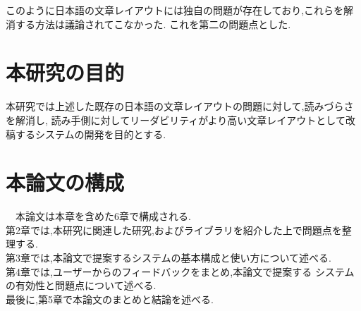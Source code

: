 このように日本語の文章レイアウトには独自の問題が存在しており,これらを解消する方法は議論されてこなかった.
これを第二の問題点とした.

\section{本研究の目的}
本研究では上述した既存の日本語の文章レイアウトの問題に対して,読みづらさを解消し,
読み手側に対してリーダビリティがより高い文章レイアウトとして改稿するシステムの開発を目的とする.

\section{本論文の構成}
 本論⽂は本章を含めた6章で構成される.
 \\第2章では,本研究に関連した研究,およびライブラリを紹介した上で問題点を整理する.
 \\第3章では,本論⽂で提案するシステムの基本構成と使い⽅について述べる.
 \\第4章では,ユーザーからのフィードバックをまとめ,本論⽂で提案する
システムの有効性と問題点について述べる.
 \\最後に,第5章で本論⽂のまとめと結論を述べる.

